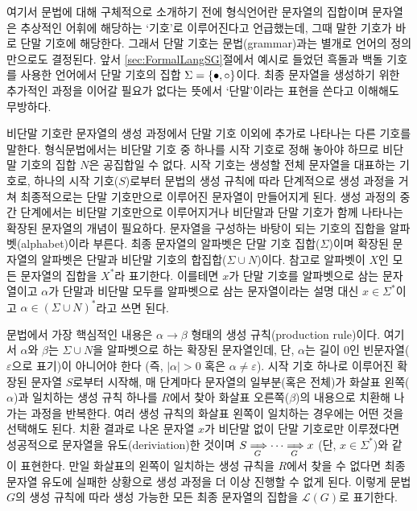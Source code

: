여기서 문법에 대해 구체적으로 소개하기 전에 형식언어란 문자열의 집합이며
문자열은 추상적인 어휘에 해당하는 `기호'로 이루어진다고 언급했는데,
그때 말한 기호가 바로 단말 기호에 해당한다.
그래서 단말 기호는 문법(grammar)과는 별개로 언어의 정의만으로도 결정된다.
앞서 \ref{sec:FormalLangSG}절에서 예시로 들었던 흑돌과 백돌 기호를 사용한
언어에서 단말 기호의 집합 $\Sigma = \{\bullet, \circ\}$이다.
최종 문자열을 생성하기 위한 추가적인 과정을 이어갈 필요가 없다는 뜻에서
`단말'이라는 표현을 쓴다고 이해해도 무방하다.

비단말 기호란 문자열의 생성 과정에서 단말 기호 이외에 추가로 나타나는
다른 기호를 말한다. 형식문법에서는 비단말 기호 중 하나를 시작 기호로
정해 놓아야 하므로 비단말 기호의 집합 $N$은 공집합일 수 없다. 시작 기호는
생성할 전체 문자열을 대표하는 기호로, 하나의 시작 기호($S$)로부터 문법의
생성 규칙에 따라 단계적으로 생성 과정을 거쳐 최종적으로는 단말 기호만으로
이루어진 문자열이 만들어지게 된다. 생성 과정의 중간 단계에서는 비단말 기호만으로
이루어지거나 비단말과 단말 기호가 함께 나타나는 확장된 문자열의 개념이 필요하다.
문자열을 구성하는 바탕이 되는 기호의 집합을 알파벳(alphabet)이라 부른다.
최종 문자열의 알파벳은 단말 기호 집합($\Sigma$)이며 확장된 문자열의 알파벳은
단말과 비단말 기호의 합집합($\Sigma\cup N$)이다. 참고로 알파벳이 $X$인
모든 문자열의 집합을 $X^{*}$라 표기한다. 이를테면
$x$가 단말 기호를 알파벳으로 삼는 문자열이고
$\alpha$가 단말과 비단말 모두를 알파벳으로 삼는 문자열이라는
설명 대신 $x\in\Sigma^{*}$이고 $\alpha\in(\Sigma\cup N)^{*}$라고 쓰면 된다.

문법에서 가장 핵심적인 내용은 $\alpha\to\beta$ 형태의 생성 규칙(production rule)이다.
여기서 $\alpha$와 $\beta$는  $\Sigma\cup N$을 알파벳으로 하는 확장된 문자열인데,
단, $\alpha$는 길이 0인 빈문자열($\varepsilon$으로 표기)이 아니어야 한다
(즉, $\lvert\alpha\rvert>0$ 혹은 $\alpha\neq\varepsilon$).
시작 기호 하나로 이루어진 확장된 문자열 $S$로부터 시작해, 매 단계마다
문자열의 일부분(혹은 전체)가 화살표 왼쪽($\alpha$)과 일치하는 생성 규칙
하나를 $R$에서 찾아 화살표 오른쪽($\beta$)의 내용으로 치환해 나가는 과정을
반복한다. 여러 생성 규칙의 화살표 왼쪽이 일치하는 경우에는 어떤 것을 선택해도 된다.
치환 결과로 나온 문자열 $x$가 비단말 없이 단말 기호로만 이루졌다면
성공적으로 문자열을 유도(deriviation)한 것이며
$S\xRightarrow[\,G]{} \cdots \xRightarrow[\,G]{} x$ (단, $x\in\Sigma^{*}$)와 같이 표현한다.
만일 화살표의 왼쪽이 일치하는 생성 규칙을 $R$에서 찾을 수 없다면
최종 문자열 유도에 실패한 상황으로 생성 과정을 더 이상 진행할 수 없게 된다.
이렇게 문법 $G$의 생성 규칙에 따라 생성 가능한 모든 최종 문자열의 집합을
$\mathcal{L}(G)$로 표기한다.

